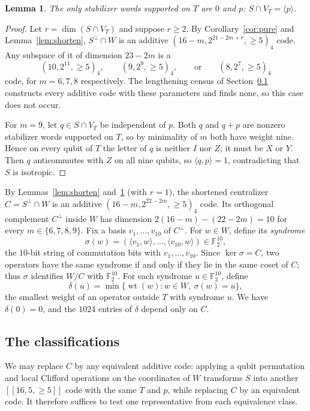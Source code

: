 \documentclass[11pt]{article}
\newtheorem{lemma}[theorem]{Lemma}
\theoremstyle{definition}
\theoremstyle{remark}
\newcommand{\F}{\mathbb F_2}
\newcommand{\qc}[1]{[\![#1]\!]}
\newcommand{\wt}{\operatorname{wt}}
\begin{document}
\begin{lemma}\label{lem:rankone}
The only stabilizer words supported on \(T\) are \(0\) and \(p\):
\(S\cap V_T=\langle p\rangle\).
\end{lemma}
\begin{proof}
Let \(r=\dim(S\cap V_T)\) and suppose \(r\geq2\). By
Corollary~\ref{cor:pure} and Lemma~\ref{lem:shorten}, \(S^\perp\cap W\)
is an additive \((16-m,2^{21-2m+r},{\geq}5)_4\) code. Any subspace of it
of dimension \(23-2m\) is a
\[
 (10,2^{11},{\geq}5)_4,\qquad (9,2^{9},{\geq}5)_4,\qquad\text{or}\qquad
 (8,2^{7},{\geq}5)_4
\]
code, for \(m=6,7,8\) respectively. The lengthening census of
Section~\ref{sec:census} constructs every additive code with these
parameters and finds none, so this case does not occur.

For \(m=9\), let \(q\in S\cap V_T\) be independent of \(p\). Both \(q\)
and \(q+p\) are nonzero stabilizer words supported on \(T\), so by
minimality of \(m\) both have weight nine. Hence on every qubit of \(T\)
the letter of \(q\) is neither \(I\) nor \(Z\); it must be \(X\) or
\(Y\). Then \(q\) anticommutes with \(Z\) on all nine qubits, so
\(\langle q,p\rangle=1\), contradicting that \(S\) is isotropic.
\end{proof}

By Lemmas~\ref{lem:shorten} and~\ref{lem:rankone} (with \(r=1\)), the
shortened centralizer \(C=S^\perp\cap W\) is an additive
\((16-m,2^{22-2m},{\geq}5)_4\) code. Its orthogonal complement
\(C^\perp\) inside \(W\) has dimension \(2(16-m)-(22-2m)=10\) for every
\(m\in\{6,7,8,9\}\). Fix a basis \(v_1,\ldots,v_{10}\) of \(C^\perp\).
For \(w\in W\), define its \emph{syndrome}
\[
 \sigma(w)=(\langle v_1,w\rangle,\ldots,\langle v_{10},w\rangle)\in\F^{10},
\]
the \(10\)-bit string of commutation bits with \(v_1,\ldots,v_{10}\).
Since \(\ker\sigma=C\), two operators have the same syndrome if and only
if they lie in the same coset of \(C\); thus \(\sigma\) identifies
\(W/C\) with \(\F^{10}\). For each syndrome \(u\in\F^{10}\), define
\[
 \delta(u)=\min\{\wt(w):w\in W,\ \sigma(w)=u\},
\]
the smallest weight of an operator outside \(T\) with syndrome \(u\). We
have \(\delta(0)=0\), and the \(1024\) entries of \(\delta\) depend only
on \(C\).

\subsection{The classifications}\label{sec:census}

We may replace \(C\) by any equivalent additive code: applying a qubit permutation and local
Clifford operations on the coordinates of \(W\) transforms \(S\) into another
\(\qc{16,5,{\geq}5}\) code with the same \(T\) and \(p\), while
replacing \(C\) by an equivalent code. It therefore suffices to test one
representative from each equivalence class.
\end{document}
